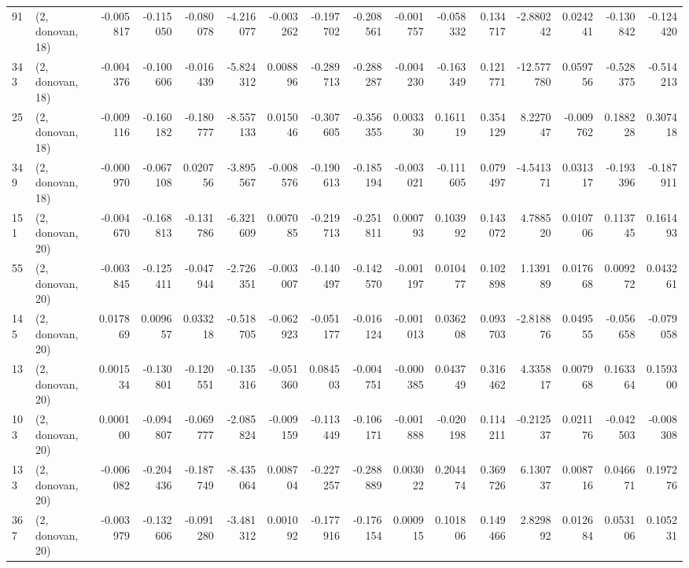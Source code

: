 \begin{tabular}{llrrrrrrrrrrrrrr}
91  &  (2, donovan, 18) &  -0.005817 & -0.115050 & -0.080078 &   -4.216077 & -0.003262 &  -0.197702 & -0.208561 & -0.001757 & -0.058332 &  0.134717 &    -2.880242 &  0.024241 & -0.130842 & -0.124420 \\
343 &  (2, donovan, 18) &  -0.004376 & -0.100606 & -0.016439 &   -5.824312 &  0.008896 &  -0.289713 & -0.288287 & -0.004230 & -0.163349 &  0.121771 &   -12.577780 &  0.059756 & -0.528375 & -0.514213 \\
25  &  (2, donovan, 18) &  -0.009116 & -0.160182 & -0.180777 &   -8.557133 &  0.015046 &  -0.307605 & -0.356355 &  0.003330 &  0.161119 &  0.354129 &     8.227047 & -0.009762 &  0.188228 &  0.307418 \\
349 &  (2, donovan, 18) &  -0.000970 & -0.067108 &  0.020756 &   -3.895567 & -0.008576 &  -0.190613 & -0.185194 & -0.003021 & -0.111605 &  0.079497 &    -4.541371 &  0.031317 & -0.193396 & -0.187911 \\
151 &  (2, donovan, 20) &  -0.004670 & -0.168813 & -0.131786 &   -6.321609 &  0.007085 &  -0.219713 & -0.251811 &  0.000793 &  0.103992 &  0.143072 &     4.788520 &  0.010706 &  0.113745 &  0.161493 \\
55  &  (2, donovan, 20) &  -0.003845 & -0.125411 & -0.047944 &   -2.726351 & -0.003007 &  -0.140497 & -0.142570 & -0.001197 &  0.010477 &  0.102898 &     1.139189 &  0.017668 &  0.009272 &  0.043261 \\
145 &  (2, donovan, 20) &   0.017869 &  0.009657 &  0.033218 &   -0.518705 & -0.062923 &  -0.051177 & -0.016124 & -0.001013 &  0.036208 &  0.093703 &    -2.818876 &  0.049555 & -0.056658 & -0.079058 \\
13  &  (2, donovan, 20) &   0.001534 & -0.130801 & -0.120551 &   -0.135316 & -0.051360 &   0.084503 & -0.004751 & -0.000385 &  0.043749 &  0.316462 &     4.335817 &  0.007968 &  0.163364 &  0.159300 \\
103 &  (2, donovan, 20) &   0.000100 & -0.094807 & -0.069777 &   -2.085824 & -0.009159 &  -0.113449 & -0.106171 & -0.001888 & -0.020198 &  0.114211 &    -0.212537 &  0.021176 & -0.042503 & -0.008308 \\
133 &  (2, donovan, 20) &  -0.006082 & -0.204436 & -0.187749 &   -8.435064 &  0.008704 &  -0.227257 & -0.288889 &  0.003022 &  0.204474 &  0.369726 &     6.130737 &  0.008716 &  0.046671 &  0.197276 \\
367 &  (2, donovan, 20) &  -0.003979 & -0.132606 & -0.091280 &   -3.481312 &  0.001092 &  -0.177916 & -0.176154 &  0.000915 &  0.101806 &  0.149466 &     2.829892 &  0.012684 &  0.053106 &  0.105231 \\

\end{tabular}
